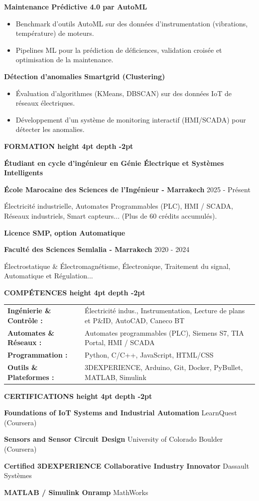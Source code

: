 \documentclass[10pt,a4paper]{altacv}
\renewcommand{\cvsection}[2][]{%
  \medskip%
  {\color{heading}\LARGE\bfseries #2 \hspace{0.2em}\leaders\vrule height 4pt depth -2pt\hfill\mbox{}}\par\smallskip
}
\renewcommand{\cvevent}[4]{%
  {\large\bfseries\color{accent}#1\par}
  \smallskip\normalsize
  \ifstrequal{#2}{}{}{%
    \textbf{\color{emphasis}#2\ifstrequal{#4}{}{}{ - #4}}%
  }%
  \hfill
  \ifstrequal{#3}{}{}{{\small#3}}%
  \par\smallskip
}
\begin{document}
{\large\bfseries\color{accent} Maintenance Prédictive 4.0 par AutoML}\\[0.05cm]
\begin{itemize}
  \item Benchmark d'outils AutoML sur des données d'instrumentation (vibrations, température) de moteurs.
  \item Pipelines ML pour la prédiction de déficiences, validation croisée et optimisation de la maintenance.
\end{itemize}

{\large\bfseries\color{accent} Détection d'anomalies Smartgrid (Clustering)}\\[0.05cm]
\begin{itemize}
  \item Évaluation d'algorithmes (KMeans, DBSCAN) sur des données IoT de réseaux électriques.
  \item Développement d'un système de monitoring interactif (HMI/SCADA) pour détecter les anomalies.
\end{itemize}


\cvsection{FORMATION}
\cvevent{Étudiant en cycle d'ingénieur en Génie Électrique et Systèmes Intelligents}{École Marocaine des Sciences de l'Ingénieur}{2025 - Présent}{Marrakech}
\small Électricité industrielle, Automates Programmables (PLC), HMI / SCADA, Réseaux industriels, Smart capteurs... (Plus de 60 crédits accumulés).

\cvevent{Licence SMP, option Automatique}{Faculté des Sciences Semlalia}{2020 - 2024}{Marrakech}
\small Électrostatique \& Électromagnétisme, Électronique, Traitement du signal, Automatique et Régulation...

\cvsection{COMPÉTENCES}
\begin{tabular}{@{}ll@{}}
\textbf{Ingénierie \& Contrôle :} & Électricité indus., Instrumentation, Lecture de plans et P\&ID, AutoCAD, Caneco BT \\[1pt]
\textbf{Automates \& Réseaux :} & Automates programmables (PLC), Siemens S7, TIA Portal, HMI / SCADA \\[1pt]
\textbf{Programmation :} & Python, C/C++, JavaScript, HTML/CSS \\[1pt]
\textbf{Outils \& Plateformes :} & 3DEXPERIENCE, Arduino, Git, Docker, PyBullet, MATLAB, Simulink \\
\end{tabular}

\cvsection{CERTIFICATIONS}
{\large\bfseries\color{accent} Foundations of IoT Systems and Industrial Automation} \hfill \color{emphasis}LearnQuest (Coursera)\par\smallskip
{\large\bfseries\color{accent} Sensors and Sensor Circuit Design} \hfill \color{emphasis}University of Colorado Boulder (Coursera)\par\smallskip
{\large\bfseries\color{accent} Certified 3DEXPERIENCE Collaborative Industry Innovator} \hfill \color{emphasis}Dassault Systèmes\par\smallskip
{\large\bfseries\color{accent} MATLAB / Simulink Onramp} \hfill \color{emphasis}MathWorks\par\smallskip
\end{document}
